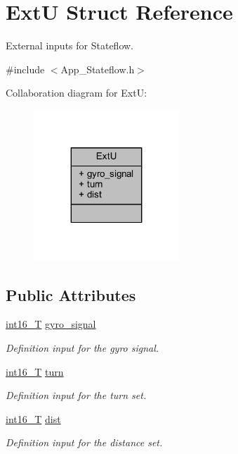 \hypertarget{struct_ext_u}{}\section{ExtU Struct Reference}
\label{struct_ext_u}


External inputs for Stateflow.  




{\ttfamily \#include $<$App\+\_\+\+Stateflow.\+h$>$}



Collaboration diagram for ExtU\+:
\nopagebreak
\begin{figure}[H]
\begin{center}
\leavevmode
\includegraphics[width=155pt]{struct_ext_u__coll__graph}
\end{center}
\end{figure}
\subsection*{Public Attributes}
\begin{DoxyCompactItemize}
\item 
\mbox{\hyperlink{_app___stateflowtypes_8h_ad73c6af88bb2ce70799e51f639309f21}{int16\+\_\+T}} \mbox{\hyperlink{struct_ext_u_a6c0a282afef47d6b37f84bc45769e69d}{gyro\+\_\+signal}}
\begin{DoxyCompactList}\small\item\em Definition input for the gyro signal. \end{DoxyCompactList}\item 
\mbox{\hyperlink{_app___stateflowtypes_8h_ad73c6af88bb2ce70799e51f639309f21}{int16\+\_\+T}} \mbox{\hyperlink{struct_ext_u_a70e9fe496991f7c0e1fe8f54c5bf4c97}{turn}}
\begin{DoxyCompactList}\small\item\em Definition input for the turn set. \end{DoxyCompactList}\item 
\mbox{\hyperlink{_app___stateflowtypes_8h_ad73c6af88bb2ce70799e51f639309f21}{int16\+\_\+T}} \mbox{\hyperlink{struct_ext_u_a6c69fa6ebe22e9a073888b6b9dce877d}{dist}}
\begin{DoxyCompactList}\small\item\em Definition input for the distance set. \end{DoxyCompactList}\end{DoxyCompactItemize}


